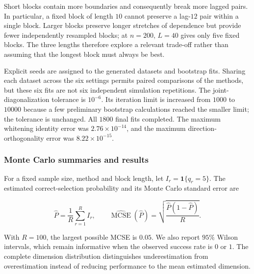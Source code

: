 \documentclass[
  11pt,
  a4paper,
]{article}
\begin{document}
Short blocks contain more boundaries and consequently break more lagged
pairs. In particular, a fixed block of length \(10\) cannot preserve a
lag-\(12\) pair within a single block. Larger blocks preserve longer
stretches of dependence but provide fewer independently resampled
blocks; at \(n=200\), \(L=40\) gives only five fixed blocks. The three
lengths therefore explore a relevant trade-off rather than assuming that
the longest block must always be best.

Explicit seeds are assigned to the generated datasets and bootstrap
fits. Sharing each dataset across the six settings permits paired
comparisons of the methods, but these six fits are not six independent
simulation repetitions. The joint-diagonalization tolerance is
\(10^{-6}\). Its iteration limit is increased from \(1000\) to \(10000\)
because a few preliminary bootstrap calculations reached the smaller
limit; the tolerance is unchanged. All \(1800\) final fits completed.
The maximum whitening identity error was \(2.76\times10^{-14}\), and the
maximum direction-orthogonality error was \(8.22\times10^{-15}\).

\hypertarget{monte-carlo-summaries-and-results}{%
\subsubsection{Monte Carlo summaries and
results}\label{monte-carlo-summaries-and-results}}

For a fixed sample size, method and block length, let
\(I_r=\mathbf 1\{\widehat q_r=5\}\). The estimated correct-selection
probability and its Monte Carlo standard error are

\[
\widehat P=\frac{1}{R}\sum_{r=1}^{R}I_r,
\qquad
\widehat{\operatorname{MCSE}}(\widehat P)
=\sqrt{\frac{\widehat P(1-\widehat P)}{R}}.
\]

With \(R=100\), the largest possible MCSE is \(0.05\). We also report
\(95\%\) Wilson intervals, which remain informative when the observed
success rate is \(0\) or \(1\). The complete dimension distribution
distinguishes underestimation from overestimation instead of reducing
performance to the mean estimated dimension.
\end{document}
